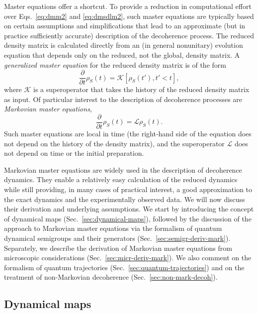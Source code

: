 \documentclass[3p,sort&compress,12pt]{elsarticle}
\newcommand{\op}[1]{#1}
\begin{document}
Master equations offer a shortcut. To provide a reduction in computational effort over Eqs.~\eqref{eq:dmm2} and \eqref{eq:dmsdlm2}, such master equations are typically based on certain assumptions and simplifications that lead to an approximate (but in practice sufficiently accurate) description of the decoherence process. The reduced density matrix is calculated directly from an (in general nonunitary) evolution equation that depends only on the reduced, not the global, density matrix. A \emph{generalized master equation} for the reduced density matrix is of the form 
%
\begin{equation}
\label{eq:dggamsdlm2}
  \frac{\partial}{\partial t} \op{\rho}_S(t) = \mathcal{K} \left[ \op{\rho}_S(t'), t' < t \right ],
\end{equation}
%
where $\mathcal{K}$ is a superoperator that takes the history of the reduced density matrix as input. Of particular interest to the description of decoherence processes are \emph{Markovian master equations}, 
%
\begin{equation}
\label{eq:dggamsdlm58672}
  \frac{\partial}{\partial t} \op{\rho}_S(t) = \mathcal{L}\op{\rho}_S(t).
\end{equation}
%
Such master equations are local in time (the right-hand side of the equation does not depend on the history of the density matrix), and the superoperator $\mathcal{L}$ does not depend on time or the initial preparation. 

Markovian master equations are widely used in the description of decoherence dynamics. They enable a relatively easy calculation of the reduced dynamics while still providing, in many cases of practical interest, a good approximation to the exact dynamics and the experimentally observed data. We will now discuss their derivation and underlying assumptions. We start by introducing the concept of dynamical maps (Sec.~\ref{sec:dynamical-maps}), followed by the discussion of the approach to Markovian master equations via the formalism of quantum dynamical semigroups and their generators (Sec.~\ref{sec:semigr-deriv-mark}). Separately, we describe the derivation of Markovian master equations from microscopic considerations (Sec.~\ref{sec:micr-deriv-mark}). We also comment on the formalism of quantum trajectories (Sec.~\ref{sec:quantum-trajectories}) and on the treatment of non-Markovian decoherence (Sec.~\ref{sec:non-mark-decoh}).

\subsection{\label{sec:dynamical-maps}Dynamical maps} 
\end{document}
